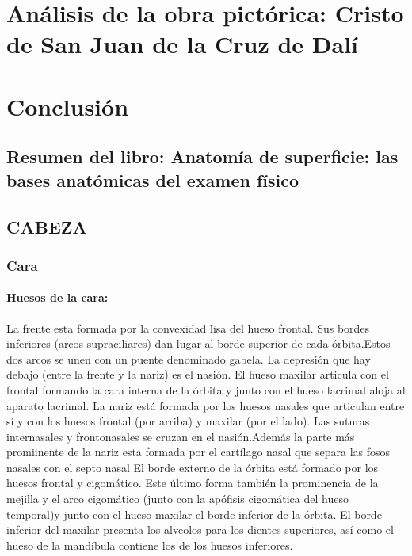 \documentclass[a4paper,12pt]{article} %
\begin{document}
\section{Análisis de la obra pictórica: Cristo de San Juan de la Cruz de Dalí}
\section{Conclusión}
\newpage

\begin{appendices}

\section{Resumen del libro: Anatomía de superficie: las bases anatómicas del examen físico}

\subsection{CABEZA}

\subsubsection{Cara}

\paragraph{Huesos de la cara:} La frente esta formada por la convexidad lisa del hueso frontal. Sus bordes inferiores (arcos supraciliares) dan lugar al borde superior de cada órbita.Estos dos arcos se unen con un puente denominado gabela. La depresión que hay debajo (entre la frente y la nariz) es el nasión.
El hueso maxilar articula con el frontal formando la cara interna de la órbita y junto con el hueso lacrimal aloja al aparato lacrimal.
La nariz  está formada por los huesos nasales que articulan entre sí y con los huesos frontal (por arriba) y maxilar (por el lado). Las suturas internasales y frontonasales se cruzan en el nasión.Además la parte más promiinente de la nariz esta formada por el cartílago nasal que separa las fosos nasales con el septo nasal
El borde externo de la órbita está formado por los huesos frontal y cigomático. Este último forma también la prominencia de la mejilla y el arco cigomático (junto con la apófisis cigomática del hueso temporal)y junto con el hueso maxilar el borde inferior de la órbita.
El borde inferior del maxilar presenta los alveolos para los dientes superiores, así como el hueso de la mandíbula contiene los de los huesos inferiores.


\end{appendices}
\end{document}
